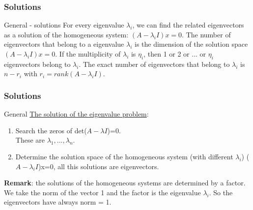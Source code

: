 \begin{frame}
	\frametitle{Solutions}
	\begin{block}{General - solutions}
		For every eigenvalue $\lambda_i$, we can find the related eigenvectors as a solution of the homogeneous system: $(A-\lambda_i I)x=0$. The number of eigenvectors that belong to a eigenvalue $\lambda_i$ is the dimension of the solution space  $(A-\lambda_i I)x=0$.
		\vspace{4mm}
		If the multiplicity of $\lambda_i$ is $\eta_i$, then 1 or 2 or ... or $\eta_i$ eigenvectors belong to $\lambda_i$. The exact number of eigenvectors that belong to $\lambda_i$ is $n-r_i$ with $r_i=rank(A-\lambda_i I)$.
	\end{block}
\end{frame}

\begin{frame}
	\frametitle{Solutions}
	\begin{block}{General}
		\underline{The solution of the eigenvalue problem}:
		\begin{enumerate}
			\item Search the zeros of det($A-\lambda I$)=0. \\
			These are $\lambda_1,...,\lambda_n$.
			\item Determine the solution space of the homogeneous system (with different $\lambda_i$) ($A-\lambda_i I$)x=0, all this solutions are eigenvectors. 
		\end{enumerate}
		\textbf{Remark}: the solutions of the homogeneous systems are determined by a factor. We take the norm of the vector 1 and the factor is the eigenvalue $\lambda_i$. So the eigenvectors have always norm = 1.
	\end{block}
\end{frame}

